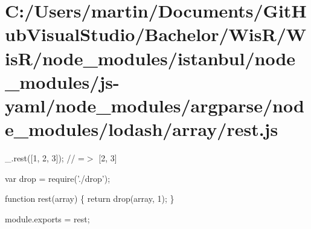 \hypertarget{_c_1_2_users_2martin_2_documents_2_git_hub_visual_studio_2_bachelor_2_wis_r_2_wis_r_2node_module32bf811be6a5874dc5b3753125406223}{}\section{C\+:/\+Users/martin/\+Documents/\+Git\+Hub\+Visual\+Studio/\+Bachelor/\+Wis\+R/\+Wis\+R/node\+\_\+modules/istanbul/node\+\_\+modules/js-\/yaml/node\+\_\+modules/argparse/node\+\_\+modules/lodash/array/rest.\+js}
\+\_\+.\+rest(\mbox{[}1, 2, 3\mbox{]}); // =$>$ \mbox{[}2, 3\mbox{]}


\begin{DoxyCodeInclude}
var drop = require(\textcolor{stringliteral}{'./drop'});

\textcolor{keyword}{function} rest(array) \{
  \textcolor{keywordflow}{return} drop(array, 1);
\}

module.exports = rest;
\end{DoxyCodeInclude}
 